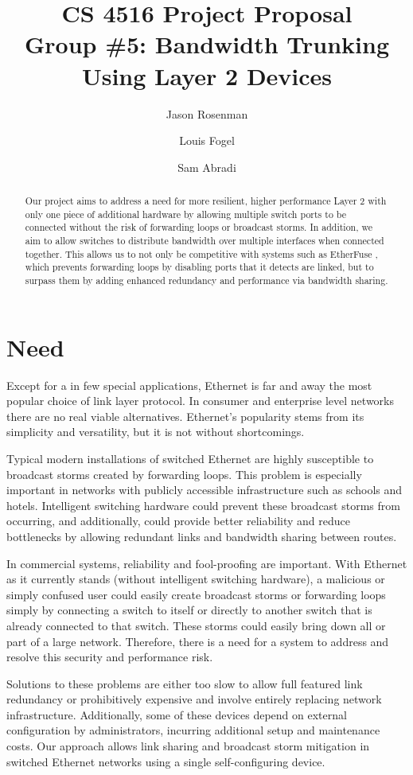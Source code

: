 \documentclass{article}
\title{CS 4516 Project Proposal\\Group \#5: Bandwidth Trunking Using Layer 2 Devices}
\author{Jason Rosenman \and Louis Fogel \and Sam Abradi}
\date{}
\begin{document}
\maketitle
\begin{abstract}
	Our project aims to address a need for more resilient, higher performance Layer 2 with only one piece of additional hardware by allowing multiple switch ports to be connected without the risk of forwarding loops or broadcast storms.
	In addition, we aim to allow switches to distribute bandwidth over multiple interfaces when connected together.
	This allows us to not only be competitive with systems such as EtherFuse \cite{etherfuse}, which prevents forwarding loops by disabling ports that it detects are linked, but to surpass them by adding enhanced redundancy and performance via bandwidth sharing.
\end{abstract}
\section{Need}
	Except for a in few special applications, Ethernet is far and away the most popular choice of link layer protocol.
	In consumer and enterprise level networks there are no real viable alternatives.
	Ethernet's popularity stems from its simplicity and versatility, but it is not without shortcomings.

	Typical modern installations of switched Ethernet are highly susceptible to broadcast storms created by forwarding loops.
	This problem is especially important in networks with publicly accessible infrastructure such as schools and hotels.
	Intelligent switching hardware could prevent these broadcast storms from occurring, and additionally, could provide better reliability and reduce bottlenecks by allowing redundant links and bandwidth sharing between routes.
	
	In commercial systems, reliability and fool-proofing are important.
	With Ethernet as it currently stands (without intelligent switching hardware), a malicious or simply confused user could easily create broadcast storms or forwarding loops simply by connecting a switch to itself or directly to another switch that is already connected to that switch.
	These storms could easily bring down all or part of a large network.
	Therefore, there is a need for a system to address and resolve this security and performance risk.
	
	Solutions to these problems are either too slow to allow full featured link redundancy or prohibitively expensive and involve entirely replacing network infrastructure.
	Additionally, some of these devices depend on external configuration by administrators, incurring additional setup  and maintenance costs.
	Our approach allows link sharing and broadcast storm mitigation in switched Ethernet networks using a single self-configuring device.
\end{document}
